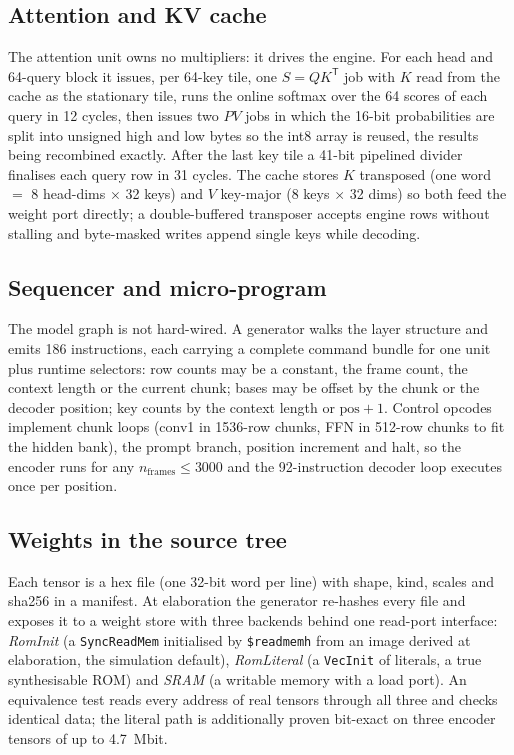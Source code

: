 \documentclass[conference]{IEEEtran}
\newcommand{\code}[1]{\texttt{#1}}
\begin{document}
\subsection{Attention and KV cache}
The attention unit owns no multipliers: it drives the engine. For each head and 64-query block it issues, per 64-key tile, one $S=QK^{\mathsf T}$ job with $K$ read from the cache as the stationary tile, runs the online softmax over the 64 scores of each query in 12 cycles, then issues two $PV$ jobs in which the 16-bit probabilities are split into unsigned high and low bytes so the int8 array is reused, the results being recombined exactly. After the last key tile a 41-bit pipelined divider finalises each query row in 31 cycles. The cache stores $K$ transposed (one word $=$ 8 head-dims $\times$ 32 keys) and $V$ key-major (8 keys $\times$ 32 dims) so both feed the weight port directly; a double-buffered transposer accepts engine rows without stalling and byte-masked writes append single keys while decoding.

\subsection{Sequencer and micro-program}
The model graph is not hard-wired. A generator walks the layer structure and emits 186 instructions, each carrying a complete command bundle for one unit plus runtime selectors: row counts may be a constant, the frame count, the context length or the current chunk; bases may be offset by the chunk or the decoder position; key counts by the context length or $\mathrm{pos}+1$. Control opcodes implement chunk loops (conv1 in 1536-row chunks, FFN in 512-row chunks to fit the hidden bank), the prompt branch, position increment and halt, so the encoder runs for any $n_{\mathrm{frames}}\le3000$ and the 92-instruction decoder loop executes once per position.

\subsection{Weights in the source tree}
Each tensor is a hex file (one 32-bit word per line) with shape, kind, scales and sha256 in a manifest. At elaboration the generator re-hashes every file and exposes it to a weight store with three backends behind one read-port interface: \emph{RomInit} (a \code{SyncReadMem} initialised by \code{\$readmemh} from an image derived at elaboration, the simulation default), \emph{RomLiteral} (a \code{VecInit} of literals, a true synthesisable ROM) and \emph{SRAM} (a writable memory with a load port). An equivalence test reads every address of real tensors through all three and checks identical data; the literal path is additionally proven bit-exact on three encoder tensors of up to \SI{4.7}{Mbit}.
\end{document}
